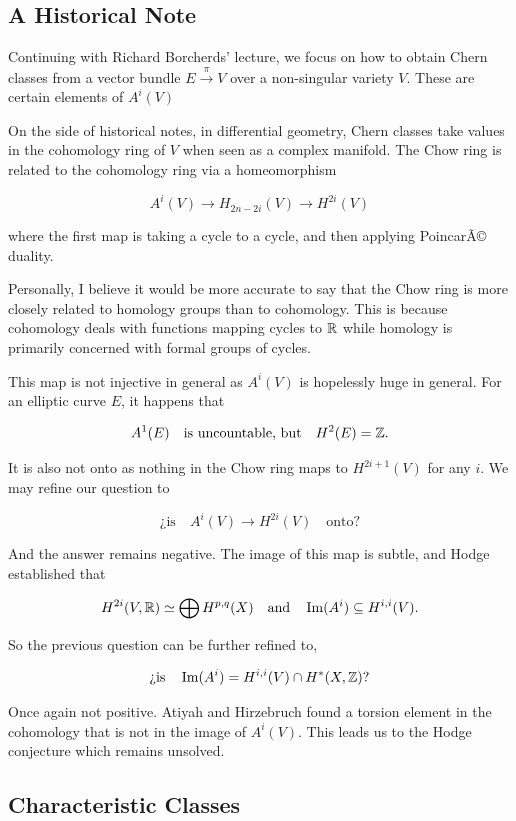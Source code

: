 \documentclass[12pt]{memoir}
\begin{document}
\subsection{A Historical Note}

Continuing with Richard Borcherds' lecture, we focus on how to obtain Chern classes from a vector bundle \(E\xrightarrow{\pi}V\) over a non-singular variety \(V\). These are certain elements of \(A^i(V)\)

On the side of historical notes, in differential geometry, Chern classes take values in the cohomology ring of \(V\) when seen as a complex manifold. The Chow ring is related to the cohomology ring via a homeomorphism

\[A^i(V)\to H_{2n-2i}(V)\to H^{2i}(V)\]

where the first map is taking a cycle to a cycle, and then applying PoincarÃ© duality.

\begin{Rmk}
    Personally, I believe it would be more accurate to say that the Chow ring is more closely related to homology groups than to cohomology. This is because cohomology deals with functions mapping cycles to \(\mathbb{R}\) while homology is primarily concerned with formal groups of cycles.
\end{Rmk}

This map is not injective in general as \(A^i(V)\) is hopelessly huge in general. For an elliptic curve \(E\), it happens that

\[A^{1}(E)\quad\text{is uncountable, but}\quad H^{2}(E)=\mathbb{Z}.\]

It is also not onto as nothing in the Chow ring maps to \(H^{2i+1}(V)\) for any \(i\). We may refine our question to

\[\text{¿is}\quad A^i(V)\to H^{2i}(V)\quad\text{onto?}\]

And the answer remains negative. The image of this map is subtle, and Hodge established that

\[H^{2i}(V,\mathbb{R})\simeq\bigoplus H^{p,q}(X)\quad\text{and}\quad\Im(A^i)\subseteq H^{i,i}(V).\]

So the previous question can be further refined to,

\[\text{¿is}\quad \Im(A^i)=H^{i,i}(V)\cap H^\ast(X,\mathbb{Z})?\]

Once again not positive. Atiyah and Hirzebruch found a torsion element in the cohomology that is not in the image of \(A^i(V)\). This leads us to the Hodge conjecture which remains unsolved.

\subsection{Characteristic Classes}
\end{document}
